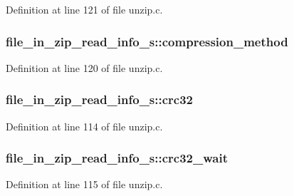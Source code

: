 Definition at line 121 of file unzip.\-c.

\hypertarget{structfile__in__zip__read__info__s_a86cbaa96568192cae9ab9cd606963fdb}{
\subsubsection[{compression\-\_\-method}]{ file\-\_\-in\-\_\-zip\-\_\-read\-\_\-info\-\_\-s\-::compression\-\_\-method}}\label{structfile__in__zip__read__info__s_a86cbaa96568192cae9ab9cd606963fdb}


Definition at line 120 of file unzip.\-c.

\hypertarget{structfile__in__zip__read__info__s_a9d7e4dc6f312fb59bf8e60fb952f4d68}{
\subsubsection[{crc32}]{ file\-\_\-in\-\_\-zip\-\_\-read\-\_\-info\-\_\-s\-::crc32}}\label{structfile__in__zip__read__info__s_a9d7e4dc6f312fb59bf8e60fb952f4d68}


Definition at line 114 of file unzip.\-c.

\hypertarget{structfile__in__zip__read__info__s_a6120c521be40e8ba530249f0c766ab9d}{
\subsubsection[{crc32\-\_\-wait}]{ file\-\_\-in\-\_\-zip\-\_\-read\-\_\-info\-\_\-s\-::crc32\-\_\-wait}}\label{structfile__in__zip__read__info__s_a6120c521be40e8ba530249f0c766ab9d}


Definition at line 115 of file unzip.\-c.

